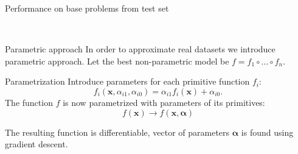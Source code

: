 \documentclass{beamer}
\begin{document}
\begin{frame}{Performance on base problems from test set}
	\begin{figure}[!ht]
		\centering
		\quad
		\\
		\quad
	\end{figure}
\end{frame}

\begin{frame}{Parametric approach}
	In order to approximate real datasets we introduce parametric approach.
	Let the best non-parametric model be $f = f_1 \circ \dots \circ f_n$.

	\begin{block}{Parametrization}
		Introduce parameters for each primitive function $f_i$:
		$$f_i(\mathbf{x}, \alpha_{i1}, \alpha_{i0}) = \alpha_{i1} f_i(\mathbf{x}) + \alpha_{i0}.$$
		The function $f$ is now parametrized with parameters of its primitives:
		$$f(\mathbf{x}) \rightarrow f(\mathbf{x}, \bm{\alpha})$$
	\end{block}
	The resulting function is differentiable, vector of parameters $\bm{\alpha}$ is found using gradient descent.
\end{frame}
\end{document}

